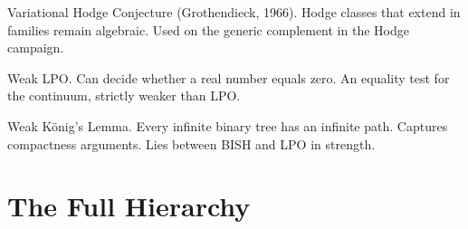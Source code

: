 \documentclass[11pt,twoside,openany]{report}
\theoremstyle{remark}
\newcommand{\BISH}{\textsf{BISH}}
\newcommand{\LPO}{\textsf{LPO}}
\begin{document}
\begin{description}[style=nextline, leftmargin=2.5cm, labelwidth=2.3cm]
\item[VHC] Variational Hodge Conjecture (Grothendieck, 1966). Hodge classes that extend in families remain algebraic. Used on the generic complement in the Hodge campaign.

\item[WLPO] Weak LPO. Can decide whether a real number equals zero. An equality test for the continuum, strictly weaker than LPO.

\item[WKL] Weak K\"onig's Lemma. Every infinite binary tree has an infinite path. Captures compactness arguments. Lies between \BISH{} and \LPO{} in strength.

\end{description}


\chapter{The Full Hierarchy}
\end{document}
